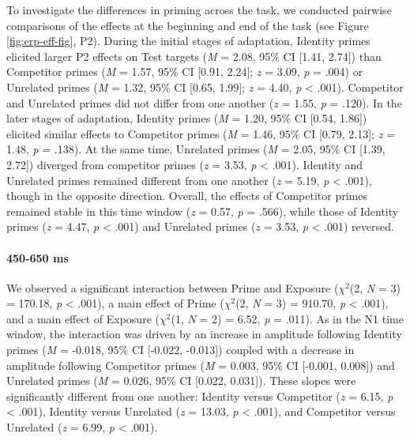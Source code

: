 \documentclass[
  12pt,
  twoside]{article}
\begin{document}
To investigate the differences in priming across the task, we conducted pairwise comparisons of the effects at the beginning and end of the task (see Figure \ref{fig:erp-eff-fig}, P2).
During the initial stages of adaptation, Identity primes elicited larger P2 effects on Test targets (\emph{M} = 2.08, 95\% CI {[}1.41, 2.74{]}) than Competitor primes (\emph{M} = 1.57, 95\% CI {[}0.91, 2.24{]}; \emph{z} = 3.09, \emph{p} = .004) or Unrelated primes (\emph{M} = 1.32, 95\% CI {[}0.65, 1.99{]}; \emph{z} = 4.40, \emph{p} \textless{} .001).
Competitor and Unrelated primes did not differ from one another (\emph{z} = 1.55, \emph{p} = .120).
In the later stages of adaptation, Identity primes (\emph{M} = 1.20, 95\% CI {[}0.54, 1.86{]}) elicited similar effects to Competitor primes (\emph{M} = 1.46, 95\% CI {[}0.79, 2.13{]}; \emph{z} = 1.48, \emph{p} = .138).
At the same time, Unrelated primes (\emph{M} = 2.05, 95\% CI {[}1.39, 2.72{]}) diverged from competitor primes (\emph{z} = 3.53, \emph{p} \textless{} .001).
Identity and Unrelated primes remained different from one another (\emph{z} = 5.19, \emph{p} \textless{} .001), though in the opposite direction.
Overall, the effects of Competitor primes remained stable in this time window (\emph{z} = 0.57, \emph{p} = .566), while those of Identity primes (\emph{z} = 4.47, \emph{p} \textless{} .001) and Unrelated primes (\emph{z} = 3.53, \emph{p} \textless{} .001) reversed.

\hypertarget{ms-2}{%
\paragraph{450-650 ms}\label{ms-2}}

We observed a significant interaction between Prime and Exposure (\(\chi^2\)(2, \emph{N} = 3) = 170.18, \emph{p} \textless{} .001), a main effect of Prime (\(\chi^2\)(2, \emph{N} = 3) = 910.70, \emph{p} \textless{} .001), and a main effect of Exposure (\(\chi^2\)(1, \emph{N} = 2) = 6.52, \emph{p} = .011).
As in the N1 time window, the interaction was driven by an increase in amplitude following Identity primes (\emph{M} = -0.018, 95\% CI {[}-0.022, -0.013{]}) coupled with a decrease in amplitude following Competitor primes (\emph{M} = 0.003, 95\% CI {[}-0.001, 0.008{]}) and Unrelated primes (\emph{M} = 0.026, 95\% CI {[}0.022, 0.031{]}).
These slopes were significantly different from one another: Identity versus Competitor (\emph{z} = 6.15, \emph{p} \textless{} .001), Identity versus Unrelated (\emph{z} = 13.03, \emph{p} \textless{} .001), and Competitor versus Unrelated (\emph{z} = 6.99, \emph{p} \textless{} .001).
\end{document}
